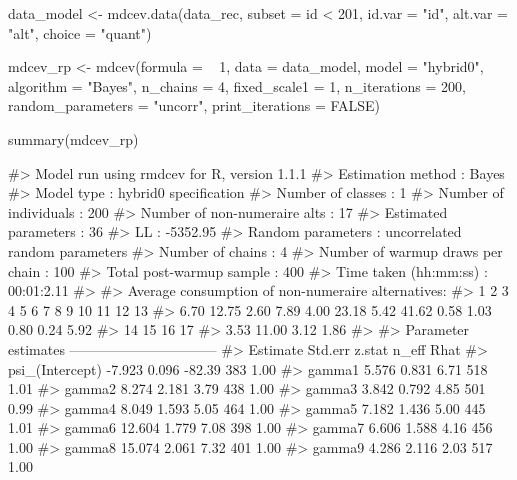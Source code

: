 \begin{Schunk}
\begin{Sinput}
data_model <- mdcev.data(data_rec, subset = id < 201,
                       id.var = "id",
                       alt.var = "alt",
                       choice = "quant") 

mdcev_rp <- mdcev(formula = ~ 1,
                    data = data_model,
                    model = "hybrid0",
                    algorithm = "Bayes",
                    n_chains = 4,
                    fixed_scale1 = 1,
                    n_iterations = 200,
                    random_parameters = "uncorr",
                    print_iterations = FALSE)
\end{Sinput}
\end{Schunk}

\begin{Schunk}
\begin{Sinput}
summary(mdcev_rp)
\end{Sinput}
\begin{Soutput}
#> Model run using rmdcev for R, version 1.1.1 
#> Estimation method                : Bayes
#> Model type                       : hybrid0 specification
#> Number of classes                : 1
#> Number of individuals            : 200
#> Number of non-numeraire alts     : 17
#> Estimated parameters             : 36
#> LL                               : -5352.95
#> Random parameters                : uncorrelated random parameters
#> Number of chains                 : 4
#> Number of warmup draws per chain : 100
#> Total post-warmup sample         : 400
#> Time taken (hh:mm:ss)            : 00:01:2.11
#> 
#> Average consumption of non-numeraire alternatives:
#>     1     2     3     4     5     6     7     8     9    10    11    12    13 
#>  6.70 12.75  2.60  7.89  4.00 23.18  5.42 41.62  0.58  1.03  0.80  0.24  5.92 
#>    14    15    16    17 
#>  3.53 11.00  3.12  1.86 
#> 
#> Parameter estimates --------------------------------  
#>                    Estimate Std.err z.stat n_eff Rhat
#> psi_(Intercept)      -7.923   0.096 -82.39   383 1.00
#> gamma1                5.576   0.831   6.71   518 1.01
#> gamma2                8.274   2.181   3.79   438 1.00
#> gamma3                3.842   0.792   4.85   501 0.99
#> gamma4                8.049   1.593   5.05   464 1.00
#> gamma5                7.182   1.436   5.00   445 1.01
#> gamma6               12.604   1.779   7.08   398 1.00
#> gamma7                6.606   1.588   4.16   456 1.00
#> gamma8               15.074   2.061   7.32   401 1.00
#> gamma9                4.286   2.116   2.03   517 1.00

\end{Soutput}
\end{Schunk}
